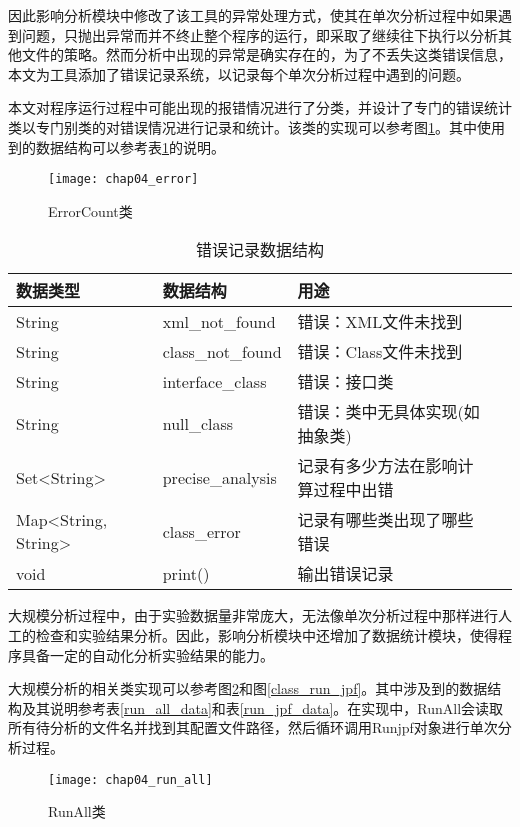 因此影响分析模块中修改了该工具的异常处理方式，使其在单次分析过程中如果遇到问题，只抛出异常而并不终止整个程序的运行，即采取了继续往下执行以分析其他文件的策略。然而分析中出现的异常是确实存在的，为了不丢失这类错误信息，本文为工具添加了错误记录系统，以记录每个单次分析过程中遇到的问题。

本文对程序运行过程中可能出现的报错情况进行了分类，并设计了专门的错误统计类以专门别类的对错误情况进行记录和统计。该类的实现可以参考图\ref {class_error}。其中使用到的数据结构可以参考表\ref {error_data}的说明。

\begin{figure}[H]
	\centering
	\texttt{[image: chap04\_error]}
	\caption {ErrorCount类}
	\label {class_error}	
\end{figure}

\begin{table}
	\caption{错误记录数据结构}
	\label{error_data}
	\centering
	\begin{tabular}{lllc}
		\toprule[1.5pt]
		{\heiti 数据类型} &{\heiti 数据结构} & {\heiti 用途} \\\midrule[1pt]
		String & xml\_not\_found & 错误：XML文件未找到 \\
		String & class\_not\_found & 错误：Class文件未找到 \\
		String & interface\_class &  错误：接口类\\
		String & null\_class & 错误：类中无具体实现(如抽象类)\\
		Set<String> & precise\_analysis & 记录有多少方法在影响计算过程中出错\\
		Map<String, String> & class\_error & 记录有哪些类出现了哪些错误\\
		void & print() & 输出错误记录\\
		\bottomrule[1.5pt]
	\end{tabular}
\end{table}

大规模分析过程中，由于实验数据量非常庞大，无法像单次分析过程中那样进行人工的检查和实验结果分析。因此，影响分析模块中还增加了数据统计模块，使得程序具备一定的自动化分析实验结果的能力。

大规模分析的相关类实现可以参考图\ref {class_run_all}和图\ref {class_run_jpf}。其中涉及到的数据结构及其说明参考表\ref {run_all_data}和表\ref {run_jpf_data}。在实现中，RunAll会读取所有待分析的文件名并找到其配置文件路径，然后循环调用Runjpf对象进行单次分析过程。

\begin{figure}[H]
	\centering
	\texttt{[image: chap04\_run\_all]}
	\caption {RunAll类}
	\label {class_run_all}	
\end{figure}

